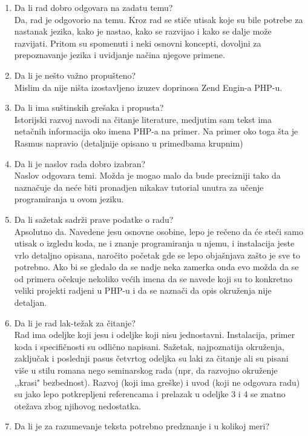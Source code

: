 \documentclass[a4paper]{report}
\begin{document}
\begin{enumerate}
\item Da li rad dobro odgovara na zadatu temu?\\
Da, rad je odgovorio na temu. Kroz rad se stiče utisak koje su bile potrebe za nastanak jezika, kako je nastao, kako se razvijao i kako se dalje može razvijati. Pritom su spomenuti i neki osnovni koncepti, dovoljni za prepoznavanje jezika i uvidjanje načina njegove primene.
\item Da li je nešto važno propušteno? \\
Mislim da nije ništa izostavljeno izuzev doprinosa Zend Engin-a PHP-u.
\item Da li ima suštinskih grešaka i propusta?\\
Istorijski razvoj navodi na čitanje literature, medjutim sam tekst ima netačnih informacija oko imena PHP-a na primer. Na primer oko toga šta je Rasmus napravio (detaljnije opisano u primedbama krupnim)
\item Da li je naslov rada dobro izabran?\\
Naslov odgovara temi. Možda je mogao malo da bude precizniji tako da naznačuje da neće biti pronadjen nikakav tutorial unutra za učenje programiranja u ovom jeziku.
\item Da li sažetak sadrži prave podatke o radu?\\
Apsolutno da. Navedene jesu osnovne osobine, lepo je rečeno da će steći samo utisak o izgledu koda, ne i znanje programiranja u njemu, i instalacija jeste vrlo detaljno opisana, naročito početak gde se lepo objašnjava zašto je sve to potrebno. Ako bi se gledalo da se nadje neka zamerka onda evo možda da se od primera očekuje nekoliko većih imena da se navede koji su to konkretno veliki projekti radjeni u PHP-u i da se naznači da opis okruženja nije detaljan.
\item Da li je rad lak-težak za čitanje?\\
Rad ima odeljke koji jesu i odeljke koji nisu jednostavni. Instalacija, primer koda i specifičnosti su odlično napisani. Sažetak, najpoznatija okruženja, zaključak i poslednji pasus četvrtog odeljka su laki za čitanje ali su pisani više u stilu romana nego seminarskog rada (npr, da razvojno okruženje ,,krasi" bezbednost). Razvoj (koji ima greške) i uvod (koji ne odgovara radu) su jako lepo potkrepljeni referencama i prelazak u odeljke 3 i 4 se znatno otežava zbog njihovog nedostatka. 
\item Da li je za razumevanje teksta potrebno predznanje i u kolikoj meri?\\

\end{enumerate}
\end{document}
